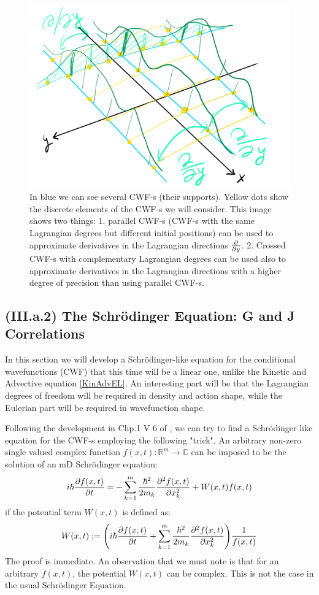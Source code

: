 \documentclass[11pt, a4paper]{article} %
\newcommand{\R}{\mathbb{R}} %
\newcommand{\C}{\mathbb{C}}
\begin{document}
\begin{figure}[h!]
  \centering
    \includegraphics[width=0.65\linewidth]{aligned_original.png}
  \caption{In blue we can see several CWF-s (their supports). Yellow dots show the discrete elements of the CWF-s we will consider. This image shows two things: 1. parallel CWF-s (CWF-s with the same Lagrangian degrees but different initial positions) can be used to approximate derivatives in the Lagrangian directions $\pdv{}{y}$. 2. Crossed CWF-s with complementary Lagrangian degrees can be used also to approximate derivatives in the Lagrangian directions with a higher degree of precision than using parallel CWF-s.  }
  \label{fig:aligned2}
\end{figure}


\subsection*{(III.a.2) The Schrödinger Equation: G and J Correlations}
In this section we will develop a Schrödinger-like equation for the conditional wavefunctions (CWF) that this time will be a linear one, unlike the Kinetic and Advective equation \eqref{KinAdvEL}. An interesting part will be that the Lagrangian degrees of freedom will be required in density and action shape, while the Eulerian part will be required in wavefunction shape. 

Following the development in Chp.1 V 6 of \cite{JordiXO}, we can try to find a Schrödinger like equation for the CWF-s employing the following "trick". An arbitrary non-zero single valued complex function $f(x, t):\R^m \rightarrow \C$ can be imposed to be the solution of an mD Schrödinger equation:\vspace{-0.3cm}
$$
i \hbar \pdv{f(x,t)}{t} = -\sum_{k=1}^m\frac{\hbar^2}{2 m_k}\pdv[2]{f(x,t)}{x_k} + W(x,t) f(x,t)
$$
if the potential term $W(x, t)$ is defined as:\vspace{-0.3cm}
$$
W(x, t) := \qty(i \hbar \pdv{f(x,t)}{t} +\sum_{k=1}^m\frac{\hbar^2}{2 m_k}\pdv[2]{f(x,t)}{x_k} ) \frac{1}{f(x,t)}\vspace{-0.3cm}
$$
The proof is immediate. An observation that we must note is that for an arbitrary $f(x,t)$, the potential $W(x,t)$ can be complex. This is not the case in the usual Schrödinger Equation.
\end{document}
